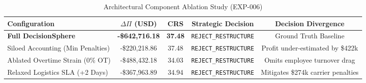 \begin{table}[htbp]
\caption{Architectural Component Ablation Study (EXP-006)}
\begin{center}
\begin{tabular}{lcccc}
\toprule
\textbf{Configuration} & $\Delta \Pi$ \textbf{(USD)} & \textbf{CRS} & \textbf{Strategic Decision} & \textbf{Decision Divergence} \\
\midrule
\textbf{Full DecisionSphere} & \textbf{-\$642,716.18} & \textbf{37.48} & \texttt{REJECT\_RESTRUCTURE} & Ground Truth Baseline \\
Siloed Accounting (Min Penalties) & -\$220,218.86 & 37.48 & \texttt{REJECT\_RESTRUCTURE} & Profit under-estimated by \$422k \\
Ablated Overtime Strain (0\% OT) & -\$488,432.18 & 34.03 & \texttt{REJECT\_RESTRUCTURE} & Omits employee turnover drag \\
Relaxed Logistics SLA (+2 Days) & -\$367,963.89 & 34.94 & \texttt{REJECT\_RESTRUCTURE} & Mitigates \$274k carrier penalties \\
\bottomrule
\end{tabular}
\label{tab:ablation_study}
\end{center}
\end{table}
